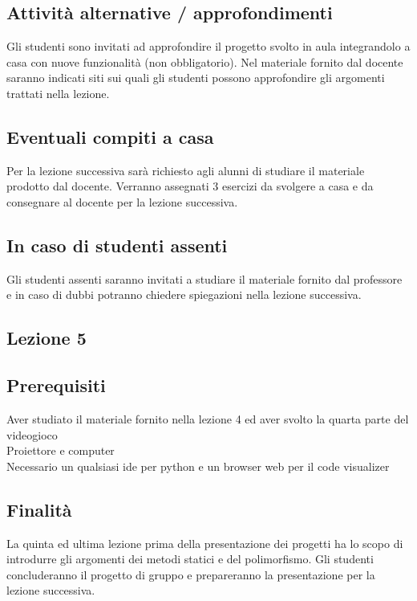 \documentclass[12pt,a4paper]{article}
\begin{document}
\subsection*{Attività alternative / approfondimenti}
Gli studenti sono invitati ad approfondire il progetto svolto in aula integrandolo a casa con nuove funzionalità (non obbligatorio). Nel materiale fornito dal docente saranno indicati siti sui quali gli studenti possono approfondire gli argomenti trattati nella lezione. 

\subsection*{Eventuali compiti a casa}
Per la lezione successiva sarà richiesto agli alunni di studiare il materiale prodotto dal docente. Verranno assegnati 3 esercizi da svolgere a casa e da consegnare al docente per la lezione successiva.


\subsection*{In caso di studenti assenti}
Gli studenti assenti saranno invitati a studiare il materiale fornito dal professore e in caso di dubbi potranno chiedere spiegazioni nella lezione successiva. 














\subsection{Lezione 5} 

\subsection*{Prerequisiti}
Aver studiato il materiale fornito nella lezione 4 ed aver svolto la quarta parte del videogioco\\
Proiettore e computer\\
Necessario un qualsiasi ide per python e un browser web per il code visualizer 



\subsection*{Finalità}
La quinta ed ultima lezione prima della presentazione dei progetti ha lo scopo di introdurre gli argomenti dei metodi statici e del polimorfismo. Gli studenti concluderanno il progetto di gruppo e prepareranno la presentazione per la lezione successiva.
\end{document}
